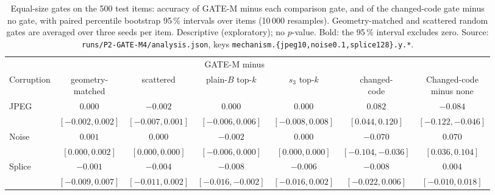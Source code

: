 \begin{table}[!tbp]
\centering
\caption{Equal-size gates on the 500 test items: accuracy of GATE-M minus each comparison gate, and of the changed-code gate minus no
gate, with paired percentile bootstrap 95\,\% intervals over items (10\,000 resamples). Geometry-matched and scattered random gates are
averaged over three seeds per item. Descriptive (exploratory); no $p$-value. Bold: the 95\,\% interval excludes zero.
Source: \nolinkurl{runs/P2-GATE-M4/analysis.json}, keys \nolinkurl{mechanism.{jpeg10,noise0.1,splice128}.y.*}.}
\label{tab:res_mech}
\footnotesize
\begin{adjustbox}{max width=\textwidth}
\begin{tabular}{lcccccc}
\toprule
& \multicolumn{5}{c}{GATE-M minus} & \\
\cmidrule(lr){2-6}
Corruption & \makecell{geometry-\\matched} & scattered & \makecell{plain-$B$\\top-$k$} & \makecell{$s_3$\\top-$k$} & \makecell{changed-\\code} & \makecell{Changed-code\\minus none} \\
\midrule
JPEG & $0.000$ & $-0.002$ & $0.000$ & $0.000$ & $\mathbf{0.082}$ & $\mathbf{-0.084}$ \\
& \scriptsize$[-0.002,0.002]$ & \scriptsize$[-0.007,0.001]$ & \scriptsize$[-0.006,0.006]$ & \scriptsize$[-0.008,0.008]$ & \scriptsize$[0.044,0.120]$ & \scriptsize$[-0.122,-0.046]$ \\
Noise & $0.001$ & $0.000$ & $-0.002$ & $0.000$ & $\mathbf{-0.070}$ & $\mathbf{0.070}$ \\
& \scriptsize$[0.000,0.002]$ & \scriptsize$[0.000,0.000]$ & \scriptsize$[-0.006,0.000]$ & \scriptsize$[0.000,0.000]$ & \scriptsize$[-0.104,-0.036]$ & \scriptsize$[0.036,0.104]$ \\
Splice & $-0.001$ & $-0.004$ & $\mathbf{-0.008}$ & $-0.006$ & $-0.008$ & $0.004$ \\
& \scriptsize$[-0.009,0.007]$ & \scriptsize$[-0.011,0.002]$ & \scriptsize$[-0.016,-0.002]$ & \scriptsize$[-0.016,0.002]$ & \scriptsize$[-0.022,0.006]$ & \scriptsize$[-0.010,0.018]$ \\
\bottomrule
\end{tabular}
\end{adjustbox}
\end{table}

